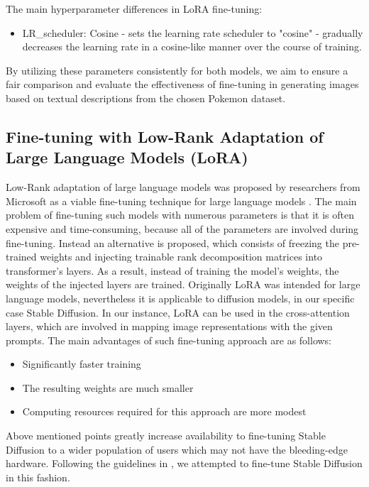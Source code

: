 \documentclass[conference]{IEEEtran}
\begin{document}
The main hyperparameter differences in LoRA fine-tuning:
\begin{itemize}
\item LR\_scheduler: Cosine - sets the learning rate scheduler to "cosine" - gradually decreases the learning rate in a cosine-like manner over the course of training.
\end{itemize}

By utilizing these parameters consistently for both models, we aim to ensure a fair comparison and evaluate the effectiveness of fine-tuning in generating images based on textual descriptions from the chosen Pokemon dataset.

\subsection{Fine-tuning with Low-Rank Adaptation of Large Language Models (LoRA)}
Low-Rank adaptation of large language models was proposed by researchers from Microsoft as a viable fine-tuning technique for large language models \cite{hu2021lora}. The main problem of fine-tuning such models with numerous parameters is that it is often expensive and time-consuming, because all of the parameters are involved during fine-tuning. Instead an alternative is proposed, which consists of freezing the pre-trained weights and injecting trainable rank decomposition matrices into transformer's layers. As a result, instead of training the model's weights, the weights of the injected layers are trained. Originally LoRA was intended for large language models, nevertheless it is applicable to diffusion models, in our specific case Stable Diffusion. In our instance, LoRA can be used in the cross-attention layers, which are involved in mapping image representations with the given prompts. The main advantages of such fine-tuning approach are as follows:
\begin{itemize}
\item Significantly faster training
\item The resulting weights are much smaller
\item Computing resources required for this approach are more modest
\end{itemize}

Above mentioned points greatly increase availability to fine-tuning Stable Diffusion to a wider population of users which may not have the bleeding-edge hardware. Following the guidelines in \cite{lorablog}, we attempted to fine-tune Stable Diffusion in this fashion.
\end{document}
